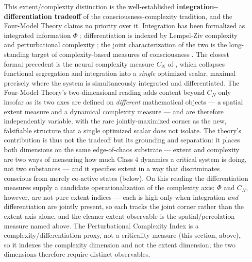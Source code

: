 \documentclass[12pt]{article}
\begin{document}
{This extent/complexity distinction is the well-established \textbf{integration--differentiation tradeoff} of the consciousness-complexity tradition, and the Four-Model Theory claims no priority over it. Integration has been formalized as integrated information $\Phi$ \citep{Tononi2004,Albantakis2023}; differentiation is indexed by Lempel-Ziv complexity and perturbational complexity \citep{Casali2013,Schartner2017}; the joint characterization of the two is the long-standing target of complexity-based measures of consciousness \citep{TononiEdelman1998}. The closest formal precedent is the neural complexity measure $C_N$ of \citet{Tononi1994}, which collapses functional segregation and integration into a \emph{single} optimized scalar, maximal precisely where the system is simultaneously integrated and differentiated. The Four-Model Theory's two-dimensional reading adds content beyond $C_N$ only insofar as its two axes are defined on \emph{different} mathematical objects --- a spatial extent measure and a dynamical complexity measure --- and are therefore independently variable, with the rare jointly-maximized corner as the new, falsifiable structure that a single optimized scalar does not isolate. The theory's contribution is thus not the tradeoff but its grounding and separation: it places both dimensions on the same edge-of-chaos substrate --- extent and complexity are two ways of measuring how much Class 4 dynamics a critical system is doing, not two substances --- and it specifies extent in a way that discriminates conscious from merely co-active states (below). On this reading the differentiation measures supply a candidate operationalization of the complexity axis; $\Phi$ and $C_N$, however, are not pure extent indices --- each is high only when integration \emph{and} differentiation are jointly present, so each tracks the joint corner rather than the extent axis alone, and the cleaner extent observable is the spatial/percolation measure named above. The Perturbational Complexity Index is a complexity/differentiation proxy, not a criticality measure (this section, above), so it indexes the complexity dimension and not the extent dimension; the two dimensions therefore require distinct observables.

}
\end{document}
